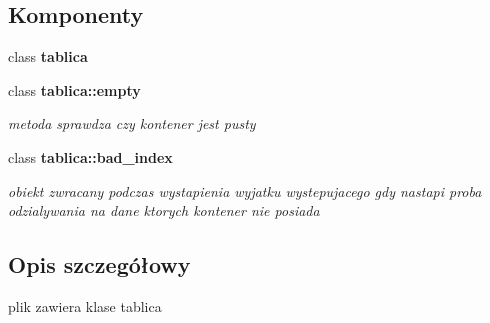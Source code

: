 \subsection*{Komponenty}
\begin{DoxyCompactItemize}
\item 
class {\bf tablica}
\item 
class {\bf tablica\+::empty}
\begin{DoxyCompactList}\small\item\em metoda sprawdza czy kontener jest pusty \end{DoxyCompactList}\item 
class {\bf tablica\+::bad\+\_\+index}
\begin{DoxyCompactList}\small\item\em obiekt zwracany podczas wystapienia wyjatku wystepujacego gdy nastapi proba odzialywania na dane ktorych kontener nie posiada \end{DoxyCompactList}\end{DoxyCompactItemize}


\subsection{Opis szczegółowy}
plik zawiera klase tablica 

